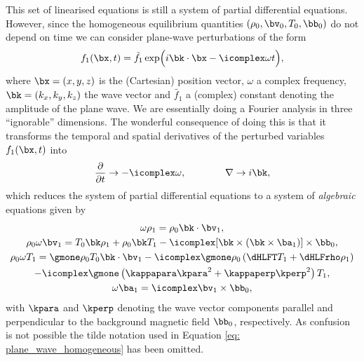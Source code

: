 This set of linearised equations is still a system of partial differential equations. However, since the homogeneous equilibrium quantities $(\rho_0, \bv_0, T_0, \bb_0)$ do not depend on time we can consider plane-wave perturbations of the form
\begin{equation} \label{eq: plane_wave_homogeneous}
  f_1(\bx, t) = \tilde{f_1}\exp\Bigl(i\bk \cdot \bx - \icomplex\omega t\Bigr),
\end{equation}
where $\bx = (x, y, z)$ is the (Cartesian) position vector, $\omega$ a complex frequency, $\bk = (k_x, k_y, k_z)$ the wave vector and $\tilde{f_1}$ a (complex) constant denoting the amplitude of the plane wave. We are essentially doing a Fourier analysis in three ``ignorable'' dimensions. The wonderful consequence of doing this is that it transforms the temporal and spatial derivatives of the perturbed variables $f_1(\bx, t)$ into
\begin{equation}
  \frac{\partial}{\partial t} \rightarrow -\icomplex\omega, \qquad\qquad
  \nabla \rightarrow i\bk,
\end{equation}
which reduces the system of partial differential equations to a system of \emph{algebraic} equations given by
\begin{gather}
  \omega \rho_1 = \rho_0 \bk \cdot \bv_1, \label{eq: homo_continuity_algebraic}\\
  \rho_0\omega \bv_1 = T_0 \bk \rho_1 + \rho_0\bk T_1 - \icomplex[\bk \times (\bk \times \ba_1)]\times\bb_0, \\
  \rho_0\omega T_1 =
    \gmone \rho_0T_0 \bk \cdot \bv_1
    - \icomplex\gmone\rho_0\left(\dHLFT T_1 + \dHLFrho \rho_1\right) \nonumber \\
    - \icomplex\gmone \left(\kappapara \kpara^2 + \kappaperp\kperp^2\right)T_1, \\
  \omega \ba_1 = \icomplex\bv_1 \times \bb_0, \label{eq: homo_induction_algebraic}
\end{gather}
with $\kpara$ and $\kperp$ denoting the wave vector components parallel and perpendicular to the background magnetic field $\bb_0$, respectively. As confusion is not possible the tilde notation used in Equation \eqref{eq: plane_wave_homogeneous} has been omitted.

